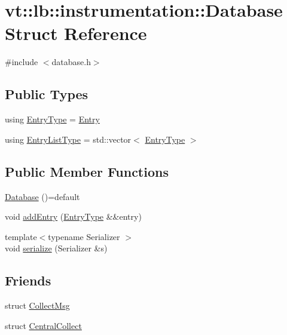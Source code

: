 \hypertarget{structvt_1_1lb_1_1instrumentation_1_1_database}{}\section{vt\+:\+:lb\+:\+:instrumentation\+:\+:Database Struct Reference}
\label{structvt_1_1lb_1_1instrumentation_1_1_database}


{\ttfamily \#include $<$database.\+h$>$}

\subsection*{Public Types}
\begin{DoxyCompactItemize}
\item 
using \hyperlink{structvt_1_1lb_1_1instrumentation_1_1_database_ab04e7d7099af7dd33f4ac1594f8cde32}{Entry\+Type} = \hyperlink{structvt_1_1lb_1_1instrumentation_1_1_entry}{Entry}
\item 
using \hyperlink{structvt_1_1lb_1_1instrumentation_1_1_database_af27c1e929c54fd378f84978cbe9360a7}{Entry\+List\+Type} = std\+::vector$<$ \hyperlink{structvt_1_1lb_1_1instrumentation_1_1_database_ab04e7d7099af7dd33f4ac1594f8cde32}{Entry\+Type} $>$
\end{DoxyCompactItemize}
\subsection*{Public Member Functions}
\begin{DoxyCompactItemize}
\item 
\hyperlink{structvt_1_1lb_1_1instrumentation_1_1_database_a4daabff0a0a252f62b7ae0a7089be1bb}{Database} ()=default
\item 
void \hyperlink{structvt_1_1lb_1_1instrumentation_1_1_database_ab9bf31b95d1c80bbe02268cd9689d453}{add\+Entry} (\hyperlink{structvt_1_1lb_1_1instrumentation_1_1_database_ab04e7d7099af7dd33f4ac1594f8cde32}{Entry\+Type} \&\&entry)
\item 
{\footnotesize template$<$typename Serializer $>$ }\\void \hyperlink{structvt_1_1lb_1_1instrumentation_1_1_database_a7e7970fb706eaf6b1f1123d5a79120d0}{serialize} (Serializer \&s)
\end{DoxyCompactItemize}
\subsection*{Friends}
\begin{DoxyCompactItemize}
\item 
struct \hyperlink{structvt_1_1lb_1_1instrumentation_1_1_database_a3775df26b6b7ed805def8013957fd548}{Collect\+Msg}
\item 
struct \hyperlink{structvt_1_1lb_1_1instrumentation_1_1_database_aeab4bdfa8ef385d221a4bb517e4d01fc}{Central\+Collect}
\end{DoxyCompactItemize}


